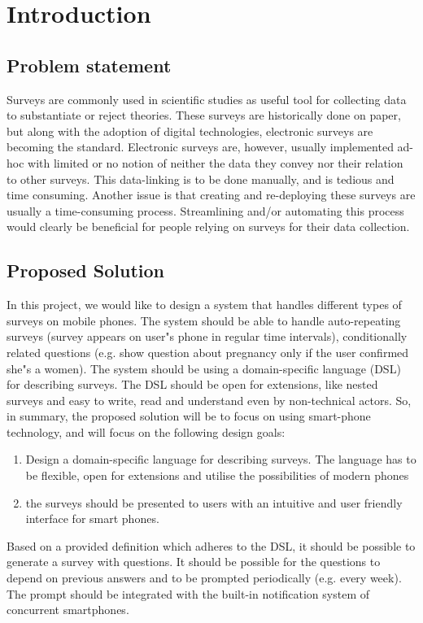 \chapter{Introduction}
\label{chap:introduction}

\section{Problem statement}
\label{sec:problemstatement}
Surveys are commonly used in scientific studies as useful tool for collecting data to substantiate or reject theories. These surveys are historically done on paper, but along with the adoption of digital technologies, electronic surveys are becoming the standard.
Electronic surveys are, however, usually implemented ad-hoc with limited or no notion of neither the data they convey nor their relation to other surveys. This data-linking is to be done manually, and is tedious and time consuming. Another issue is that creating and re-deploying these surveys are usually a time-consuming process.
Streamlining and/or automating this process would clearly be beneficial for people relying on surveys for their data collection.

\section{Proposed Solution}
\label{sec:proposedsolution}
In this project, we would like to design a system that handles different types of surveys on mobile phones. The system should be able to handle auto-repeating surveys (survey appears on user"s phone in regular time intervals), conditionally related questions (e.g. show question about pregnancy only if the user confirmed she"s a women).
The system should be using a domain-specific language (DSL) for describing surveys. The DSL should be open for extensions, like nested surveys and easy to write, read and understand even by non-technical actors.
So, in summary, the proposed solution will be to focus on using smart-phone technology, and will focus on the following design goals:
\begin{enumerate}
  \item Design a domain-specific language for describing surveys. The language has to be flexible, open for extensions and utilise the possibilities of modern phones
  \item the surveys should be presented to users with an intuitive and user friendly interface for smart phones.
\end{enumerate}
Based on a provided definition which adheres to the DSL, it should be possible to generate a survey with questions. It should be possible for the questions to depend on previous answers and to be prompted periodically (e.g. every week). The prompt should be integrated with the built-in notification system of concurrent smartphones.

